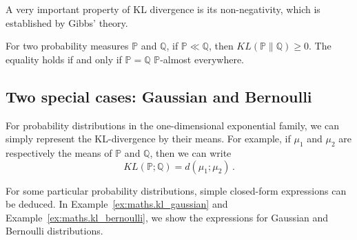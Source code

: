 A very important property of KL divergence is its non-negativity, which is established by Gibbs' theory.

\begin{theorem}\label{thm:maths.gibbs}
\begin{leftbar}[theorembar]
	For two probability measures $\mathbb{P}$ and $\mathbb{Q}$, if $\mathbb{P} \ll \mathbb{Q}$, then $KL(\mathbb{P} \lVert \mathbb{Q}) \geq 0$. The equality holds if and only if $\mathbb{P} = \mathbb{Q}$ $\mathbb{P}$-almost everywhere.
\end{leftbar}
\end{theorem}



\subsection{Two special cases: Gaussian and Bernoulli}\label{app:maths.information.examples}

For probability distributions in the one-dimensional exponential family, we can simply represent the KL-divergence by their means. For example, if $\mu_1$ and $\mu_2$ are respectively the means of $\mathbb{P}$ and $\mathbb{Q}$, then we can write
\[
    KL(\mathbb{P};\mathbb{Q}) = d(\mu_1;\mu_2)\,.
\]

For some particular probability distributions, simple closed-form expressions can be deduced. In Example~\ref{ex:maths.kl_gaussian} and Example~\ref{ex:maths.kl_bernoulli}, we show the expressions for Gaussian and Bernoulli distributions.

